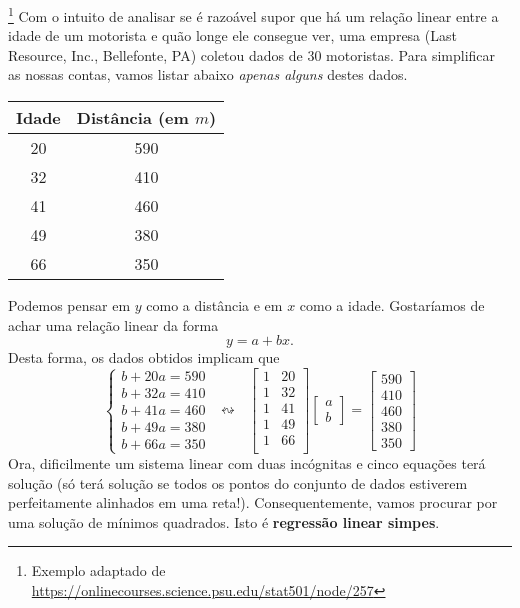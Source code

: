 \documentclass[../livro.tex]{subfiles}  %
\begin{document}
\begin{example}\footnote{Exemplo adaptado de \url{https://onlinecourses.science.psu.edu/stat501/node/257}}\label{exp:idade}
Com o intuito de analisar se é razoável supor que há um relação linear entre a idade de um motorista e quão longe ele consegue ver, uma empresa (Last Resource, Inc., Bellefonte, PA) coletou dados de 30 motoristas. Para simplificar as nossas contas, vamos listar abaixo \textit{apenas alguns} destes dados.
\begin{center}
 \begin{tabular}{|c|c|}
      \hline
      Idade & Distância (em $m$) \\ \hline
      20 & 590 \\
      32 & 410 \\
      41 & 460 \\
      49 & 380 \\
      66 & 350 \\
      \hline
  \end{tabular}
\end{center} Podemos pensar em $y$ como a distância e em $x$ como a idade. Gostaríamos de achar uma relação linear da forma
\[
  y = a + b x.
\] Desta forma, os dados obtidos implicam que  
\[
\left\{
    \begin{array}{ll}
      b + 20 a = 590 \\
      b + 32 a = 410 \\
      b + 41 a = 460 \\
      b + 49 a = 380 \\
      b + 66 a = 350
    \end{array}
  \right. \ \ \leftrightsquigarrow \ \ \
  \begin{bmatrix}
    1 & 20 \\
    1 & 32 \\
    1 & 41 \\
    1 & 49 \\
    1 & 66 \\
  \end{bmatrix}
  \begin{bmatrix}
    a \\ b
  \end{bmatrix} =
  \begin{bmatrix}
    590 \\ 410 \\ 460 \\ 380 \\ 350
  \end{bmatrix}
  \] Ora, dificilmente um sistema linear com duas incógnitas e cinco equações terá solução (só terá solução se todos os pontos do conjunto de dados estiverem perfeitamente alinhados em uma reta!). Consequentemente, vamos procurar por uma solução de mínimos quadrados. Isto é \textbf{regressão linear simpes}.


\end{example}
\end{document}
